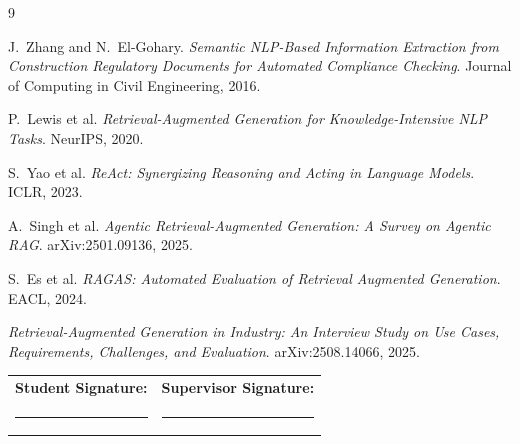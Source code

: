 \documentclass[10pt,a4paper]{article}
\begin{document}
\begingroup
\renewcommand{\refname}{\texorpdfstring{\color{mainblue}}{}Preliminary References}
\scriptsize
\begin{thebibliography}{9}
\setlength{\itemsep}{0pt}

J.\ Zhang and N.\ El-Gohary.
\textit{Semantic NLP-Based Information Extraction from Construction Regulatory Documents for Automated Compliance Checking}.
Journal of Computing in Civil Engineering, 2016.

P.\ Lewis et al.
\textit{Retrieval-Augmented Generation for Knowledge-Intensive NLP Tasks}.
NeurIPS, 2020.

S.\ Yao et al.
\textit{ReAct: Synergizing Reasoning and Acting in Language Models}.
ICLR, 2023.

A.\ Singh et al.
\textit{Agentic Retrieval-Augmented Generation: A Survey on Agentic RAG}.
arXiv:2501.09136, 2025.

S.\ Es et al.
\textit{RAGAS: Automated Evaluation of Retrieval Augmented Generation}.
EACL, 2024.

\textit{Retrieval-Augmented Generation in Industry: An Interview Study on Use Cases, Requirements, Challenges, and Evaluation}.
arXiv:2508.14066, 2025.

\end{thebibliography}
\endgroup

\vspace{0.1em}

\noindent
\begin{tabularx}{\textwidth}{X X}
\textbf{Student Signature:} & \textbf{Supervisor Signature:} \\[0.9em]
\rule{0.42\textwidth}{0.4pt} & \rule{0.42\textwidth}{0.4pt} \\
\end{tabularx}
\end{document}
